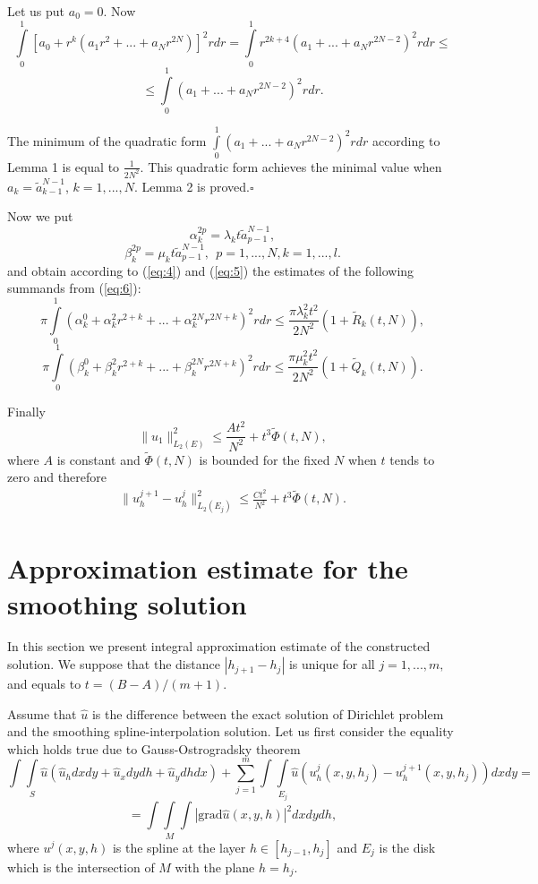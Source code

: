 \documentclass{amsart}
\begin{document}
Let us put $a_0=0$. Now
$$
\int\limits_0^1[a_0+r^k(a_1 r^2+...+a_N r^{2N})]^2 r
dr=\int\limits_0^1 r^{2k+4}(a_1+...+a_N r^{2N-2})^2 r dr\leq
$$
$$
\leq \int\limits_0^1 (a_1+...+a_N r^{2N-2})^2 r dr.
$$

The minimum of the  quadratic form $\int\limits_0^1 (a_1+...+a_N
r^{2N-2})^2 r dr$ according to Lemma 1 is equal to $\frac{1}{2
N^2}$. This quadratic form achieves the minimal value when
$a_k=\tilde{a}_{k-1}^{N-1}$, $k=1,...,N$. Lemma 2 is
proved.$\square$

Now we put
$$
\alpha_k^{2p}=\lambda_k t\tilde{a}_{p-1}^{N-1},
$$
$$
\beta_k^{2p}=\mu_k t\tilde{a}_{p-1}^{N-1},\   \  p=1,...,N,
k=1,...,l.
$$
and obtain according to (\ref{eq:4}) and (\ref{eq:5}) the estimates
of the following summands from (\ref{eq:6}):
$$
\pi \int\limits_0^1(\alpha_k^0+\alpha_k^2 r^{2+k}+...+\alpha_k^{2N}
r^{2N+k})^2 r dr \leq \frac{\pi \lambda_k^2 t^2}{2
N^2}(1+\tilde{R}_k(t,N)),
$$
$$
\pi \int\limits_0^1(\beta_k^0+\beta_k^2 r^{2+k}+...+\beta_k^{2N}
r^{2N+k})^2 r dr \leq \frac{\pi \mu_k^2 t^2}{2
N^2}(1+\tilde{Q}_k(t,N)).
$$

Finally
$$
\|u_1\|^2_{L_2(E)}\leq \frac{A t^2}{N^2} +t^3\tilde{\Phi}(t,N),
$$
where $A$ is constant and $\tilde{\Phi}(t,N)$ is bounded for the
fixed $N$ when $t$ tends to zero and therefore
\begin{eqnarray}
\|u^{j+1}_h-u^j_h\|^2_{L_2(E_j)}\leq \frac{C t^2}{N^2}
+t^3\tilde{\Phi}(t,N).\label{eq:7}
\end{eqnarray}


\section{Approximation estimate for the smoothing solution}

In this section we present integral approximation estimate of the
constructed solution. We suppose that the distance $|h_{j+1}-h_j|$
is unique for all $j=1,...,m,$ and equals to $t=(B-A)/(m+1)$.


Assume that $\hat{u}$ is the difference between the exact solution
of Dirichlet problem and the smoothing spline-interpolation
solution. Let us first consider the equality which holds true due to
Gauss-Ostrogradsky theorem
$$
\int\int\limits_{S} \hat{u} (\hat{u}_h dx dy+ \hat{u}_x dy dh+
\hat{u}_y dh dx)+\sum\limits_{j=1}^m  \int\int\limits_{E_j} \hat{u}
(u^j_h(x,y,h_j)-u^{j+1}_h(x,y,h_j)) dx dy =
$$
$$
 =\int\int\limits_{M}\int |\mathrm{grad} \hat{u}(x, y,
h)|^2 dx dy dh,
$$
where $u^j(x,y,h)$ is the spline at the layer $h\in[h_{j-1},h_j]$
and $E_j$ is the disk which is the intersection of $M$ with the
plane $h=h_j$.
\end{document}
